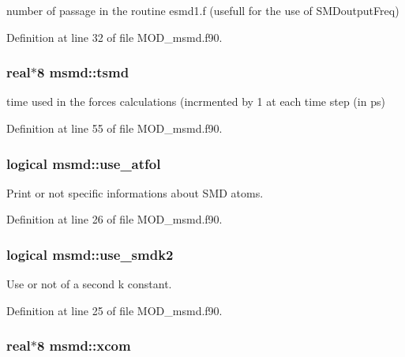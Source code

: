 number of passage in the routine esmd1.\-f (usefull for the use of S\-M\-Doutput\-Freq) 



Definition at line 32 of file M\-O\-D\-\_\-msmd.\-f90.

\hypertarget{classmsmd_a732bc76cad0c25d269baab2d99fec305}{
\subsubsection[{tsmd}]{\setlength{\rightskip}{0pt plus 5cm}real$\ast$8 msmd\-::tsmd}}\label{classmsmd_a732bc76cad0c25d269baab2d99fec305}


time used in the forces calculations (incrmented by 1 at each time step (in ps) 



Definition at line 55 of file M\-O\-D\-\_\-msmd.\-f90.

\hypertarget{classmsmd_aca46d500e14101f21a92d03f2a41d76e}{
\subsubsection[{use\-\_\-atfol}]{\setlength{\rightskip}{0pt plus 5cm}logical msmd\-::use\-\_\-atfol}}\label{classmsmd_aca46d500e14101f21a92d03f2a41d76e}


Print or not specific informations about S\-M\-D atoms. 



Definition at line 26 of file M\-O\-D\-\_\-msmd.\-f90.

\hypertarget{classmsmd_a8394605ebe4793bedcc802719a1e0183}{
\subsubsection[{use\-\_\-smdk2}]{\setlength{\rightskip}{0pt plus 5cm}logical msmd\-::use\-\_\-smdk2}}\label{classmsmd_a8394605ebe4793bedcc802719a1e0183}


Use or not of a second k constant. 



Definition at line 25 of file M\-O\-D\-\_\-msmd.\-f90.

\hypertarget{classmsmd_aeae9f59cff9e8a4b11066ba325492d92}{
\subsubsection[{xcom}]{\setlength{\rightskip}{0pt plus 5cm}real$\ast$8 msmd\-::xcom}}\label{classmsmd_aeae9f59cff9e8a4b11066ba325492d92}


